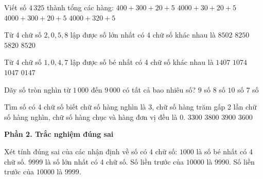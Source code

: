 \begin{ex} %
Viết số $4\,325$ thành tổng các hàng:
\choice
{$400 + 300 + 20 + 5$}
{$4000 + 30 + 20 + 5$}
{\True $4000 + 300 + 20 + 5$}
{$4000 + 320 + 5$}
\end{ex}

\begin{ex} %
Từ 4 chữ số $2, 0, 5, 8$ lập được số lớn nhất có 4 chữ số khác nhau là
\choice
{$8502$}
{$8250$}
{$5820$}
{\True $8520$}
\end{ex}

\begin{ex} %
Từ 4 chữ số $1, 0, 4, 7$ lập được số bé nhất có 4 chữ số khác nhau là
\choice
{$1407$}
{$1074$}
{\True $1047$}
{$0147$}
\end{ex}

\begin{ex} %
Dãy số tròn nghìn từ $1\,000$ đến $9\,000$ có tất cả bao nhiêu số?
\choice
{\True $9$ số}
{$8$ số}
{$10$ số}
{$7$ số}
\end{ex}

\begin{ex} %
Tìm số có 4 chữ số biết chữ số hàng nghìn là 3, chữ số hàng trăm gấp 2 lần chữ số hàng nghìn, chữ số hàng chục và hàng đơn vị đều là 0.
\choice
{$3300$}
{$3800$}
{$3900$}
{\True $3600$}
\end{ex}

\textbf{Phần 2. Trắc nghiệm đúng sai}

\begin{ex} %
Xét tính đúng sai của các nhận định về số có 4 chữ số:
\choiceTF
{\True $1000$ là số bé nhất có 4 chữ số.}
{\True $9999$ là số lớn nhất có 4 chữ số.}
{Số liền trước của $10000$ là $9990$.}
{\True Số liền trước của $10000$ là $9999$.}
\end{ex}

